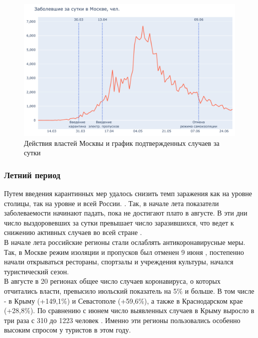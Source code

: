 \documentclass[a4paper, 12pt]{extarticle}
\begin{document}
\begin{figure}[h]
    \centering
    \includegraphics[scale=0.55]{../plots/7daily_confirmed_with_events_moscow_1.pdf}
    \caption{Действия властей Москвы и график подтвержденных случаев за сутки}
    \label{fig:day_confirmed_moscow_with_events1}
\end{figure}

\subsubsection{Летний период}
Путем введения карантинных мер удалось снизить темп заражения как на уровне столицы, так на уровне и всей России. . Так, в начале лета показатели заболеваемости начинают падать, пока не достигают плато в августе. В эти дни число выздоровевших за сутки превышает число заразившихся, что ведет к снижению активных случаев во всей стране .
\\

В начале лета российские регионы стали ослаблять антикоронавирусные меры. Так, в Москве режим изоляции и пропусков был отменен 9 июня , постепенно начали открываться рестораны, спортзалы и учреждения культуры, начался туристический сезон.
\\

В августе в 20 регионах общее число случаев коронавируса, о которых отчитались власти, превысило июльский показатель на 5\% и больше. В том числе - в Крыму (+149,1\%) и Севастополе (+59,6\%), а также в Краснодарском крае (+28,8\%). По сравнению с июнем число выявленных случаев в Крыму выросло в три раза с 310 до 1223 человек . Именно эти регионы пользовались особенно высоким спросом у туристов в этом году.
\end{document}
